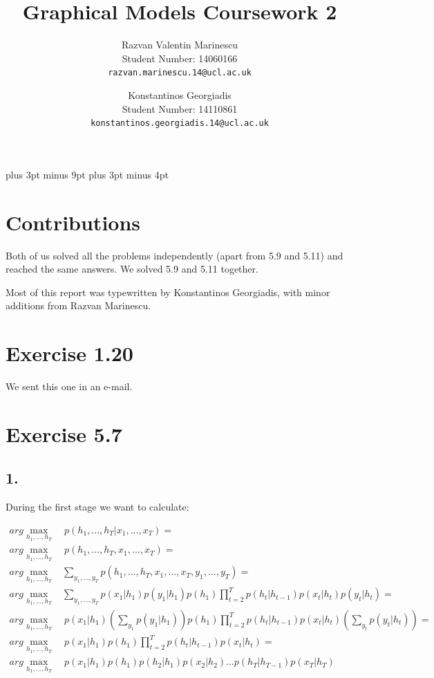 \documentclass[11pt,a4paper,oneside]{report}
\title{Graphical Models Coursework 2}
\author{
Razvan Valentin Marinescu\\
Student Number: 14060166\\
\texttt{razvan.marinescu.14@ucl.ac.uk}
\and
Konstantinos Georgiadis\\
Student Number: 14110861\\
\texttt{konstantinos.georgiadis.14@ucl.ac.uk}
}
\begin{document}
\belowdisplayskip=12pt plus 3pt minus 9pt
\belowdisplayshortskip=7pt plus 3pt minus 4pt
\maketitle{}

\section*{Contributions}

Both of us solved all the problems independently (apart from 5.9 and 5.11) and reached the same answers. We solved 5.9 and 5.11 together. 

Most of this report was typewritten by Konstantinos Georgiadis, with minor additions from Razvan Marinescu.

\section*{Exercise 1.20}

	We sent this one in an e-mail.

\section*{Exercise 5.7}

\subsection*{1.}

During the first stage we want to calculate:	

\begin{align*}
arg\max_{h_1,...,h_T}&\ p(h_1,...,h_T|x_1,...,x_T)=\\
arg\max_{h_1,...,h_T}&\ p(h_1,...,h_T,x_1,...,x_T)=\\
arg\max_{h_1,...,h_T}&\sum_{y_1,...,y_T}p(h_1,...,h_T,x_1,...,x_T,y_1,...,y_T)=\\		
arg\max_{h_1,...,h_T}&\sum_{y_1,...,y_T}p(x_1|h_1)p(y_1|h_1)p(h_1)\prod_{t=2}^Tp(h_t|h_{t-1})p(x_t|h_t)p(y_t|h_t)=\\	
arg\max_{h_1,...,h_T}&\ p(x_1|h_1)\left(\sum_{y_1}p(y_1|h_1)\right)p(h_1)\prod_{t=2}^Tp(h_t|h_{t-1})p(x_t|h_t)\left(\sum_{y_t}p(y_t|h_t)\right)=\\	
arg\max_{h_1,...,h_T}&\ p(x_1|h_1)p(h_1)\prod_{t=2}^Tp(h_t|h_{t-1})p(x_t|h_t)=\\		
arg\max_{h_1,...,h_T}&\ p(x_1|h_1)p(h_1)p(h_2|h_1)p(x_2|h_2)...p(h_T|h_{T-1})p(x_T|h_T)			
\end{align*}
\end{document}
